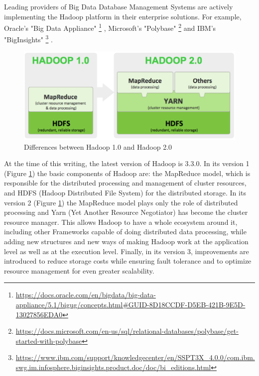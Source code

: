 \documentclass[12pt,english]{book}
\begin{document}
Leading providers of Big Data Database Management Systems are actively implementing the Hadoop platform in their enterprise solutions.
For example, Oracle's "Big Data Appliance"
\footnote{\url{https://docs.oracle.com/en/bigdata/big-data-appliance/5.1/bigug/concepts.html\#GUID-8D18CCDF-D5EB-421B-9E5D-13027856EDA0}}
, Microsoft's "Polybase"
\footnote{\url{https://docs.microsoft.com/en-us/sql/relational-databases/polybase/get-started-with-polybase}}
and IBM's "BigInsights" 
\footnote{\url{https://www.ibm.com/support/knowledgecenter/en/SSPT3X\_4.0.0/com.ibm.swg.im.infosphere.biginsights.product.doc/doc/bi\_editions.html}}
.

\begin{figure}[ht]
\centering
\includegraphics[width=\linewidth]{hadoop1vshadoop2}
\caption[Differences between Hadoop 1.0 and Hadoop 2.0]{Differences between Hadoop 1.0 and Hadoop 2.0 \footnotemark}
\label{fig:differenceBetweenHadoop1and2}
\end{figure}

At the time of this writing, the latest version of Hadoop is 3.3.0.
In its version 1 (Figure \ref{fig:differenceBetweenHadoop1and2}) the basic components of Hadoop are: the MapReduce model, which is responsible for the distributed processing and management of cluster resources, and HDFS (Hadoop Distributed File System) for the distributed storage.
In its version 2 (Figure \ref{fig:differenceBetweenHadoop1and2}) the MapReduce model plays only the role of distributed processing and Yarn (Yet Another Resource Negotiator) has become the cluster resource manager.
This allows Hadoop to have a whole ecosystem around it, including other Frameworks capable of doing distributed data processing, while adding new structures and new ways of making Hadoop work at the application level as well as at the execution level.
Finally, in its version 3, improvements are introduced to reduce storage costs while ensuring fault tolerance and to optimize resource management for even greater scalability.
\end{document}
